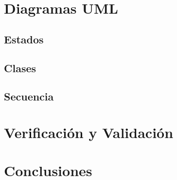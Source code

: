 \documentclass[a4paper]{article}
\begin{document}
	\section{Diagramas UML}

	\subsection*{Estados}
	\subsection*{Clases}
	\subsection*{Secuencia}
	
	\section{Verificación y Validación}

	

	\section{Conclusiones}
	
	

	
\end{document}

